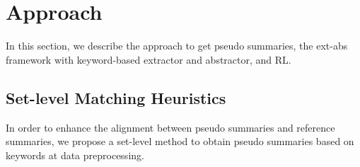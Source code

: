 \section{Approach}
\label{sec:approach}
In this section, we describe the approach to get pseudo summaries, 
the ext-abs framework
with keyword-based extractor and abstractor, and RL.

\subsection{Set-level Matching Heuristics}
In order to enhance the alignment between pseudo summaries and reference summaries,
we propose a set-level method to obtain
pseudo summaries based on keywords at data preprocessing.

